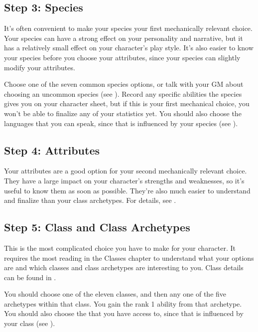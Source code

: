     \subsection{Step 3: Species}
        It's often convenient to make your species your first mechanically relevant choice.
        Your species can have a strong effect on your personality and narrative, but it has a relatively small effect on your character's play style.
        It's also easier to know your species before you choose your attributes, since your species can slightly modify your attributes.

        Choose one of the seven common species options, or talk with your GM about choosing an uncommon species (see ).
        Record any specific abilities the species gives you on your character sheet, but if this is your first mechanical choice, you won't be able to finalize any of your statistics yet.
        You should also choose the languages that you can speak, since that is influenced by your species (see ).

    \subsection{Step 4: Attributes}
        Your attributes are a good option for your second mechanically relevant choice.
        They have a large impact on your character's strengths and weaknesses, so it's useful to know them as soon as possible.
        They're also much easier to understand and finalize than your class archetypes.
        For details, see .

    \subsection{Step 5: Class and Class Archetypes}
        This is the most complicated choice you have to make for your character.
        It requires the most reading in the Classes chapter to understand what your options are and which classes and class archetypes are interesting to you.
        Class details can be found in .

        You should choose one of the eleven classes, and then any one of the five archetypes within that class.
        You gain the rank 1 ability from that archetype.
        You should also choose the  that you have access to, since that is influenced by your class (see ).


